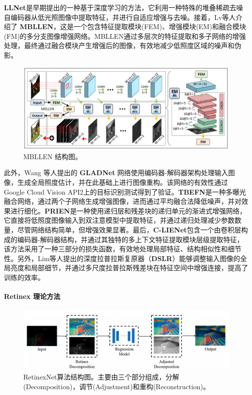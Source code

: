 \documentclass[a4paper]{ctexart}
\begin{document}
	\textbf{LLNet}\cite{lore2017llnet}是早期提出的一种基于深度学习的方法，它利用一种特殊的堆叠稀疏去噪自编码器从低光照图像中提取特征，并进行自适应增强与去噪。接着，Lv等人\cite{lv2018mbllen}介绍了 \textbf{MBLLEN}，这是一个包含特征提取模块(FEM)、增强模块(EM)和融合模块(FM)的多分支图像增强网络。MBLLEN通过多层次的特征提取和多子网络的增强处理，最终通过融合模块产生增强后的图像，有效地减少低照度区域的噪声和伪影。
	
	\begin{figure}[htb]
		\centering 
		\includegraphics[width=\columnwidth]{picture/LLIE/MBLLEN/MBLLEN Architecture}
		\caption{
			\label{fig: MBLLEN Architecture} 
			MBLLEN 结构图。
		}
	\end{figure}
	
	此外，Wang 等人\cite{wang2018gladnet}提出的 \textbf{GLADNet} 网络使用编码器-解码器架构处理输入图像，生成全局照度估计，并在此基础上进行图像重构。该网络的有效性通过Google Cloud Vision API2上的目标识别测试得到了验证。\textbf{TBEFN}\cite{lu2020tbefn}是一种多曝光融合网络，通过两个子网络生成增强图像，进而通过平均融合法降低噪声，并对效果进行细化。\textbf{PRIEN}\cite{li2021low}是一种使用递归层和残差块的递归单元的渐进式增强网络，它直接将低照度图像输入到双注意模型中提取特征，并通过递归处理减少参数数量，尽管网络结构简单，但增强效果显著。最后，\textbf{C-LIENet}\cite{ravirathinam2021c}包含一个由卷积层构成的编码器-解码器结构，并通过其独特的多上下文特征提取模块层级提取特征，该方法采用了一种三部分的损失函数，有效地处理局部特征、结构相似性和细节性。另外，Lim等人\cite{lim2020dslr}提出的深度拉普拉斯复原器（\textbf{DSLR}）能够调整输入图像的全局亮度和局部细节，并通过多尺度拉普拉斯残差块在特征空间中增强连接，提高了训练的效率。
	
	\paragraph{Retinex 理论方法}
	
	\begin{figure}[htb]
		\centering 
		\includegraphics[width=0.7\columnwidth]{picture/LLIE/RetinexNet/RetinexNet}
		\caption{
			\label{fig: RetinexNet} 
			RetinexNet算法结构图。主要由三个部分组成，分解(Decomposition)，调节(Adjustment)和重构(Reconstruction)。
		}
	\end{figure}
	
\end{document}
